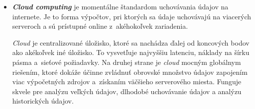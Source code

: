 \begin{itemize}
    
    \item \textit{\textbf{Cloud computing}} je momentálne štandardom uchovávania údajov na internete. 
    Je to forma výpočtov, pri ktorých sa údaje uchovávajú na viacerých serveroch a sú prístupné online z~akéhokoľvek zariadenia.~\cite{teamDigetum_2022}
    
    \emph{Cloud} je centralizované úložisko, ktoré sa nachádza ďalej od koncových bodov ako akékoľvek iné úložisko. 
    To vysvetľuje najvyššiu latenciu, náklady na šírku pásma a~sieťové požiadavky. 
    Na druhej strane je \emph{cloud} mocným globálnym riešením, ktoré dokáže účinne zvládnuť obrovské množstvo údajov zapojením viac výpočetných zdrojov a~získaním väčšieho serverového miesta.
    Funguje skvele pre analýzu veľkých údajov, dlhodobé uchovávanie údajov a analýzu historických údajov.~\cite{teamDigetum_2022}
\end{itemize}
